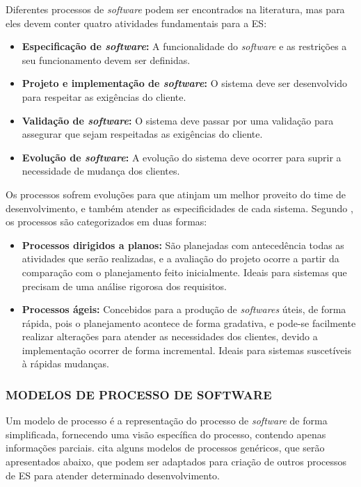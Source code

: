 Diferentes processos de \textit{software} podem ser encontrados na literatura, mas para \cite{iansommerville} eles devem conter quatro atividades fundamentais para a ES:

\begin{itemize}
    \item \textbf{Especificação de \textit{software}:} A funcionalidade do \textit{software} e as restrições a seu funcionamento devem ser definidas.
    \item \textbf{Projeto e implementação de \textit{software}:} O sistema deve ser desenvolvido para respeitar as exigências do cliente. 
    \item \textbf{Validação de \textit{software}:} O sistema deve passar por uma validação para assegurar que sejam respeitadas as exigências do cliente.
    \item \textbf{Evolução de \textit{software}:} A evolução do sistema deve ocorrer para suprir a necessidade de mudança dos clientes. 
\end{itemize}


Os processos sofrem evoluções para que atinjam um melhor proveito do time de desenvolvimento, e também atender as especificidades de cada sistema. Segundo \cite{iansommerville}, os processos são categorizados em duas formas:

\begin{itemize}
    \item \textbf{Processos dirigidos a planos:} São planejadas com antecedência todas as atividades que serão realizadas, e a avaliação do projeto ocorre a partir da comparação com o planejamento feito inicialmente. Ideais para sistemas que precisam de uma análise rigorosa dos requisitos.
    \item \textbf{Processos ágeis:} Concebidos para a produção de \textit{softwares} úteis, de forma rápida, pois o planejamento acontece de forma gradativa, e pode-se facilmente realizar alterações para atender as necessidades dos clientes, devido a implementação ocorrer de forma incremental. Ideais para sistemas suscetíveis à rápidas mudanças.
\end{itemize}


\subsubsection{MODELOS DE PROCESSO DE SOFTWARE}
\label{subsec:modelosProcesso}

Um modelo de processo é a representação do processo de \textit{software} de forma simplificada, fornecendo uma visão específica do processo, contendo apenas informações parciais. \cite{Pressman2011} cita alguns modelos de processos genéricos, que serão apresentados abaixo, que podem ser adaptados para criação de outros processos de ES para atender determinado desenvolvimento.

